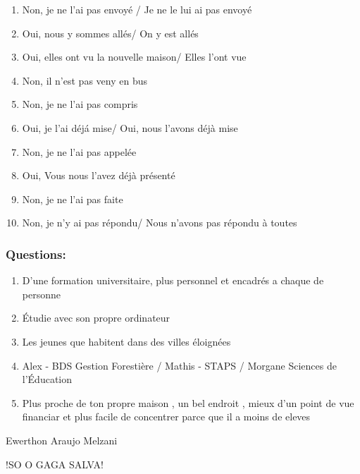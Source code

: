 \documentclass{article}
\begin{document}
\begin{enumerate}
    \item Non, je ne l'ai pas envoyé / Je ne le lui ai pas envoyé
    \item Oui, nous y sommes allés/ On y est allés
    \item Oui, elles ont vu la nouvelle maison/ Elles l'ont vue 
    \item Non, il n'est pas veny en bus
    \item Non, je ne l'ai pas compris
    \item Oui, je l'ai déjá mise/ Oui, nous l'avons déjà mise
    \item Non, je ne l'ai pas appelée
    \item Oui, Vous nous l'avez déjà présenté
    \item Non, je ne l'ai pas faite  
    \item Non, je n'y ai pas répondu/ Nous n'avons pas répondu à toutes
\end{enumerate}

\vspace*{1.5 cm}


\subsubsection*{Questions:}

\begin{enumerate}
    \item D'une formation universitaire, plus personnel et encadrés a chaque de personne
    \item Étudie avec son propre ordinateur 
    \item Les jeunes que habitent dans des villes éloignées 
    \item Alex - BDS Gestion Forestière / Mathis - STAPS / Morgane Sciences de l'Éducation
    \item Plus proche de ton propre maison , un bel endroit , mieux d'un point de vue financiar et plus facile de concentrer parce que il a moins de eleves
\end{enumerate}


\LARGE{Ewerthon Araujo Melzani}

\vspace*{1.5 cm}

\huge{!SO O GAGA SALVA!}
\end{document}
